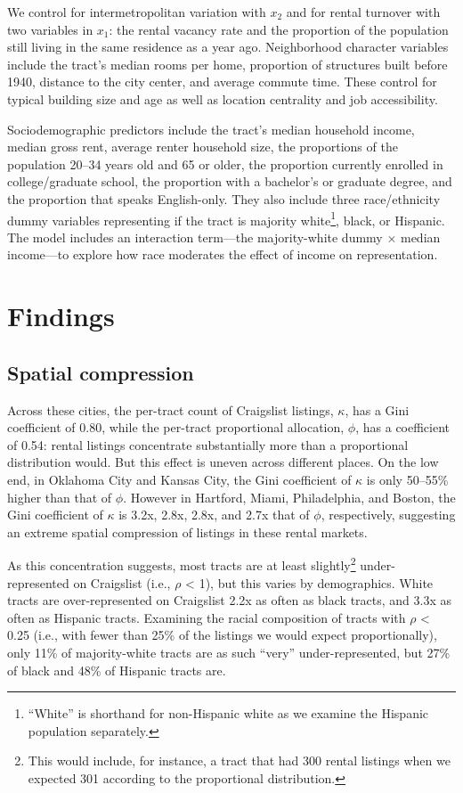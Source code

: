 \documentclass[12pt,onecolumn]{article} %
\begin{document}
We control for intermetropolitan variation with $x_2$ and for rental turnover with two variables in $x_1$: the rental vacancy rate and the proportion of the population still living in the same residence as a year ago. Neighborhood character variables include the tract's median rooms per home, proportion of structures built before 1940, distance to the city center, and average commute time. These control for typical building size and age as well as location centrality and job accessibility. 

Sociodemographic predictors include the tract's median household income, median gross rent, average renter household size, the proportions of the population 20--34 years old and 65 or older, the proportion currently enrolled in college/graduate school, the proportion with a bachelor's or graduate degree, and the proportion that speaks English-only. They also include three race/ethnicity dummy variables representing if the tract is majority white\footnote{\enquote{White} is shorthand for non-Hispanic white as we examine the Hispanic population separately.}, black, or Hispanic. The model includes an interaction term---the majority-white dummy $\times$ median income---to explore how race moderates the effect of income on representation.




\section{Findings}

\subsection{Spatial compression}

Across these cities, the per-tract count of Craigslist listings, $\kappa$, has a Gini coefficient of 0.80, while the per-tract proportional allocation, $\phi$, has a coefficient of 0.54: rental listings concentrate substantially more than a proportional distribution would. But this effect is uneven across different places. On the low end, in Oklahoma City and Kansas City, the Gini coefficient of $\kappa$ is only 50--55\% higher than that of $\phi$. However in Hartford, Miami, Philadelphia, and Boston, the Gini coefficient of $\kappa$ is 3.2x, 2.8x, 2.8x, and 2.7x that of $\phi$, respectively, suggesting an extreme spatial compression of listings in these rental markets.

As this concentration suggests, most tracts are at least slightly\footnote{This would include, for instance, a tract that had 300 rental listings when we expected 301 according to the proportional distribution.} under-represented on Craigslist (i.e., $\rho$ < 1), but this varies by demographics. White tracts are over-represented on Craigslist 2.2x as often as black tracts, and 3.3x as often as Hispanic tracts. Examining the racial composition of tracts with $\rho$ < 0.25 (i.e., with fewer than 25\% of the listings we would expect proportionally), only 11\% of majority-white tracts are as such \enquote{very} under-represented, but 27\% of black and 48\% of Hispanic tracts are.
\end{document}
